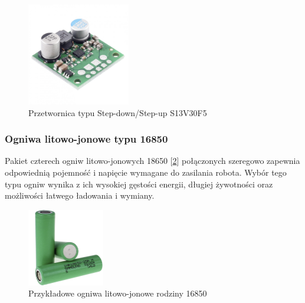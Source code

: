 \begin{figure}[H]
        \centering
        \includegraphics[width=0.4\textwidth]{./graf/step-down.png}
        \caption{Przetwornica typu Step-down/Step-up S13V30F5}
        \label{zdj:step-down}
\end{figure}

\subsubsection*{Ogniwa litowo-jonowe typu 16850}
Pakiet czterech ogniw litowo-jonowych 18650 [\ref{zdj:ogniwa}] połączonych szeregowo zapewnia odpowiednią pojemność i napięcie wymagane do zasilania robota. Wybór tego typu ogniw wynika z ich wysokiej gęstości energii, długiej żywotności oraz możliwości łatwego ładowania i wymiany.

\begin{figure}[H]
        \centering
        \includegraphics[width=0.3\textwidth]{./graf/ogniwa.png}
        \caption{Przykładowe ogniwa litowo-jonowe rodziny 16850}
        \label{zdj:ogniwa}
\end{figure}

\clearpage

